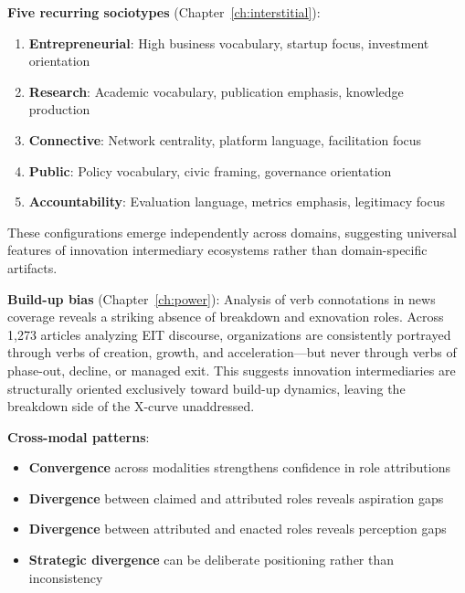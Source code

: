 \documentclass[../main.tex]{subfiles}
\begin{document}
\textbf{Five recurring sociotypes} (Chapter~\ref{ch:interstitial}):
\begin{enumerate}[leftmargin=*, itemsep=0.2em]
\item \textbf{Entrepreneurial}: High business vocabulary, startup focus, investment orientation
\item \textbf{Research}: Academic vocabulary, publication emphasis, knowledge production
\item \textbf{Connective}: Network centrality, platform language, facilitation focus
\item \textbf{Public}: Policy vocabulary, civic framing, governance orientation
\item \textbf{Accountability}: Evaluation language, metrics emphasis, legitimacy focus
\end{enumerate}

These configurations emerge independently across domains, suggesting universal features of innovation intermediary ecosystems \cite{adner2017ecosystem,jacobides2018ecosystems} rather than domain-specific artifacts.

\textbf{Build-up bias} (Chapter~\ref{ch:power}): Analysis of verb connotations in news coverage reveals a striking absence of breakdown and exnovation roles. Across 1,273 articles analyzing EIT discourse, organizations are consistently portrayed through verbs of creation, growth, and acceleration---but never through verbs of phase-out, decline, or managed exit. This suggests innovation intermediaries are structurally oriented exclusively toward build-up dynamics, leaving the breakdown side of the X-curve unaddressed.

\textbf{Cross-modal patterns}:
\begin{itemize}[leftmargin=*, itemsep=0.2em]
\item \textbf{Convergence} across modalities strengthens confidence in role attributions
\item \textbf{Divergence} between claimed and attributed roles reveals aspiration gaps
\item \textbf{Divergence} between attributed and enacted roles reveals perception gaps
\item \textbf{Strategic divergence} can be deliberate positioning rather than inconsistency
\end{itemize}
\end{document}
